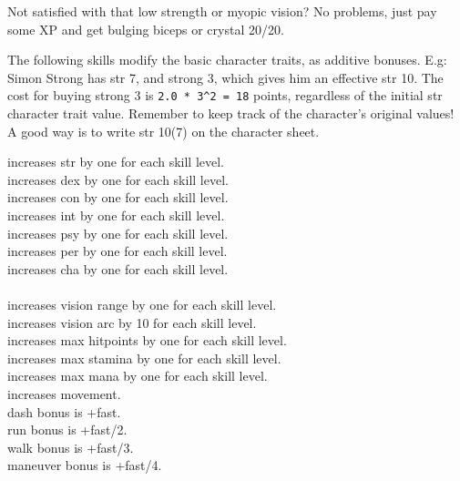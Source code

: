 Not satisfied with that low strength or myopic vision? No problems, just pay some XP and get bulging biceps or crystal 20/20.

The following skills modify the basic character traits, as additive bonuses.
E.g: Simon Strong has str 7, and strong 3, which gives him an effective str 10.
The cost for buying strong 3 is \verb|2.0 * 3^2 = 18| points, regardless of the initial str character trait value. Remember to keep track of the character's original values! A good way is to write str 10(7) on the character sheet.


\openskillslist

 increases str by one for each skill level. \\
 increases dex by one for each skill level. \\
 increases con by one for each skill level. \\
 increases int by one for each skill level. \\
 increases psy by one for each skill level. \\
 increases per by one for each skill level. \\
 increases cha by one for each skill level. \\
 \\
 increases vision range by one for each skill level. \\
 increases vision arc by 10 for each skill level. \\
 increases max hitpoints by one for each skill level. \\
 increases max stamina by one for each skill level. \\
 increases max mana by one for each skill level. \\
 increases movement. \\
dash bonus is +fast. \\
run bonus is +fast/2. \\
walk bonus is +fast/3. \\
maneuver bonus is +fast/4.

\closeskillslist


